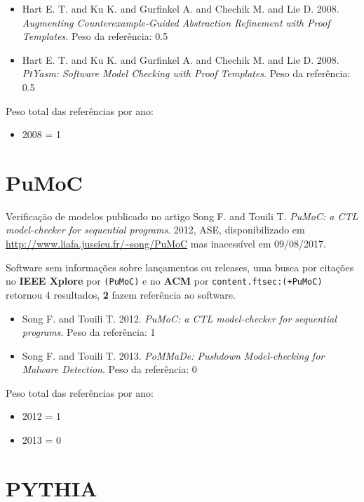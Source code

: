 \begin{itemize}
\item Hart E. T. and Ku K. and Gurfinkel A. and Chechik M. and Lie D.
      2008.
      {\it Augmenting Counterexample-Guided Abstraction Refinement with Proof Templates}.
      Peso da referência: 0.5
\item Hart E. T. and Ku K. and Gurfinkel A. and Chechik M. and Lie D.
      2008.
      {\it PtYasm: Software Model Checking with Proof Templates}.
      Peso da referência: 0.5
\end{itemize}

Peso total das referências por ano:

\begin{itemize}
\item 2008 = 1
\end{itemize}


\section{PuMoC}

Verificação de modelos
publicado no artigo
Song F. and Touili T.
{\it PuMoC: a CTL model-checker for sequential programs}.
2012,
ASE,
disponibilizado em \url{http://www.liafa.jussieu.fr/~song/PuMoC}
mas inacessível em 09/08/2017.

Software sem informações sobre lançamentos ou releases,
uma busca por citações no {\bf IEEE Xplore} por
\texttt{(PuMoC)}
e no {\bf ACM} por
\texttt{content.ftsec:(+PuMoC)}
retornou
4 resultados,
{\bf 2} fazem referência ao software.

\begin{itemize}
\item Song F. and Touili T.
      2012.
      {\it PuMoC: a CTL model-checker for sequential programs}.
      Peso da referência: 1
\item Song F. and Touili T.
      2013.
      {\it PoMMaDe: Pushdown Model-checking for Malware Detection}.
      Peso da referência: 0
\end{itemize}

Peso total das referências por ano:

\begin{itemize}
\item 2012 = 1
\item 2013 = 0
\end{itemize}


\section{PYTHIA}

